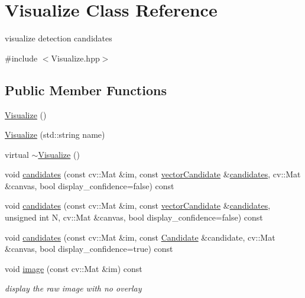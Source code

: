 \hypertarget{classVisualize}{\section{\-Visualize \-Class \-Reference}
\label{classVisualize}
}


visualize detection candidates  




{\ttfamily \#include $<$\-Visualize.\-hpp$>$}

\subsection*{\-Public \-Member \-Functions}
\begin{DoxyCompactItemize}
\item 
\hyperlink{classVisualize_a8d4163ad53518ec0c8a3eaec2bf2fe7b}{\-Visualize} ()
\item 
\hyperlink{classVisualize_aa4934674b915dc27dd262c5b5a6970b0}{\-Visualize} (std\-::string name)
\item 
virtual \hyperlink{classVisualize_a50a487bde1d6e77a2b16a2abb28dd066}{$\sim$\-Visualize} ()
\item 
void \hyperlink{classVisualize_ada4023e56a4a59e9b8ecd6c1d8c4c99b}{candidates} (const cv\-::\-Mat \&im, const \hyperlink{types_8hpp_a04eefdf70d6c6b8effb5170271f1db05}{vector\-Candidate} \&\hyperlink{classVisualize_ada4023e56a4a59e9b8ecd6c1d8c4c99b}{candidates}, cv\-::\-Mat \&canvas, bool display\-\_\-confidence=false) const 
\item 
void \hyperlink{classVisualize_a4dad0bd9e94aed0c454cf21027fdeb87}{candidates} (const cv\-::\-Mat \&im, const \hyperlink{types_8hpp_a04eefdf70d6c6b8effb5170271f1db05}{vector\-Candidate} \&\hyperlink{classVisualize_ada4023e56a4a59e9b8ecd6c1d8c4c99b}{candidates}, unsigned int \-N, cv\-::\-Mat \&canvas, bool display\-\_\-confidence=false) const 
\item 
void \hyperlink{classVisualize_a49be21958241fe18358d999483d734e2}{candidates} (const cv\-::\-Mat \&im, const \hyperlink{classCandidate}{\-Candidate} \&candidate, cv\-::\-Mat \&canvas, bool display\-\_\-confidence=true) const 
\item 
void \hyperlink{classVisualize_a0464561197342e3a26d2f2bf317f3611}{image} (const cv\-::\-Mat \&im) const 
\begin{DoxyCompactList}\small\item\em display the raw image with no overlay \end{DoxyCompactList}\end{DoxyCompactItemize}
